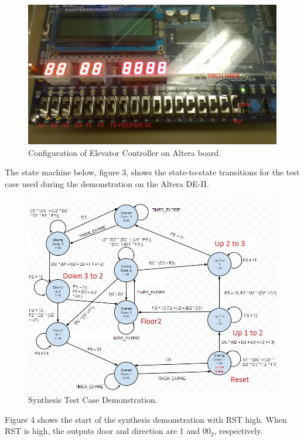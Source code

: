 \documentclass[journal]{IEEEtran}
\begin{document}
\begin{figure}[h]
\centering
\includegraphics[width=0.9\linewidth]{Altera_Config.jpg}
\caption{Configuration of Elevator Controller on Altera board.}
\label{altera_configuration}
\end{figure}

The state machine below, figure 3, shows the state-to-state transitions for the test case used during the demonstration on the Altera DE-II. 

\begin{figure}[h]
\centering
\includegraphics[width=0.9\linewidth]{Synth_State_Machine.jpg}
\caption{Synthesis Test Case Demonstration.}
\label{synth_state_machine}
\end{figure}

Figure 4 shows the start of the synthesis demonstration with RST high. When RST is high, the outputs door and direction are 1 and 00$_{2}$, respectively. 
\end{document}
